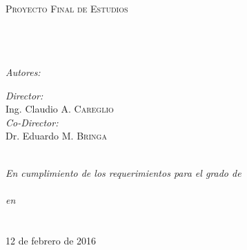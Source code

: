 \documentclass[10pt, twoside]{Thesis} %
\begin{document}
\begin{titlepage}
\begin{center}

\textsc{\LARGE \univname}\\[1.5cm] %
\textsc{\Large Proyecto Final de Estudios}\\[0.5cm] %

\HRule \\[0.4cm] %
{\huge \bfseries \ttitle}\\[0.4cm] %
\HRule \\[1.5cm] %
 
\begin{minipage}{0.4\textwidth}
\begin{flushleft} \large
\emph{Autores:}\\
{\authornames} %
\end{flushleft}
\end{minipage}
\begin{minipage}{0.4\textwidth}
\begin{flushright} \large
\emph{Director:} \\
{Ing. Claudio A. \textsc{Careglio}}\\
\emph{Co-Director:} \\
{Dr. Eduardo M. \textsc{Bringa}}
\end{flushright}
\end{minipage}\\[3cm]
 
\large \textit{En cumplimiento de los requerimientos para el grado de\\\degreename}\\[0.3cm] %
\textit{en}\\[0.4cm]
\facname\\\univname\\[2cm] %
 
{\large 12 de febrero de 2016}\\[4cm] %
 
\vfill
\end{center}

\end{titlepage}

\end{document}

